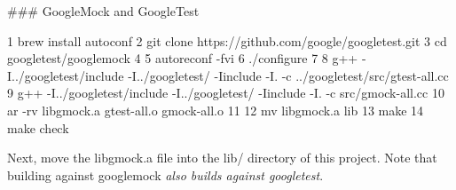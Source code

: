\#\#\# Google\+Mock and Google\+Test 
\begin{DoxyCode}
1 brew install autoconf
2 git clone https://github.com/google/googletest.git
3 cd googletest/googlemock
4 
5 autoreconf -fvi
6 ./configure
7 
8 g++ -I../googletest/include -I../googletest/ -Iinclude -I. -c ../googletest/src/gtest-all.cc 
9 g++ -I../googletest/include -I../googletest/ -Iinclude -I. -c src/gmock-all.cc 
10 ar -rv libgmock.a gtest-all.o gmock-all.o
11 
12 mv libgmock.a lib
13 make
14 make check
\end{DoxyCode}


Next, move the libgmock.\+a file into the lib/ directory of this project. Note that building against googlemock {\itshape also builds against googletest}. 